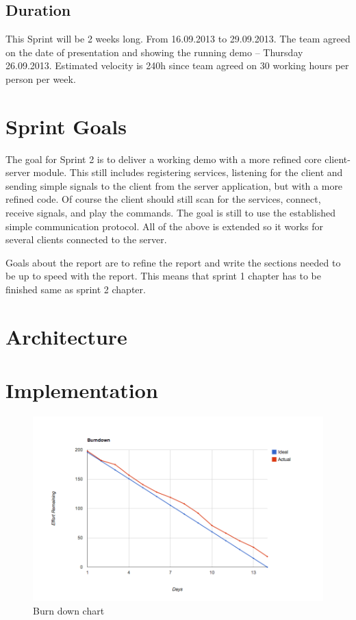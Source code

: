 \subsection{Duration}
This Sprint will be 2 weeks long. From 16.09.2013 to 29.09.2013.
The team agreed on the date of presentation and showing the running demo -- Thursday 26.09.2013.
Estimated velocity is 240h since team agreed on 30 working hours per person per week.

\section{Sprint Goals}
The goal for Sprint 2 is to deliver a working demo with a more refined core client-server module. 
This still includes registering services, listening for the client and sending simple signals to the client from the server application, but with a more refined code. 
Of course the client should still scan for the services, connect, receive signals, and play the commands. 
The goal is still to use the established simple communication protocol. 
All of the above is extended so it works for several clients connected to the server.

Goals about the report are to refine the report and write the sections needed to be up to speed with the report. This means that sprint 1 chapter has to be finished same as sprint 2 chapter. 

\section{Architecture}
\section{Implementation}

\begin{figure}[H]
	\centering
		\includegraphics[width=18cm]{sprint2/BurndownSprint2.png}
	\caption{Burn down chart}
	\label{fig:Burn2 }
\end{figure}
